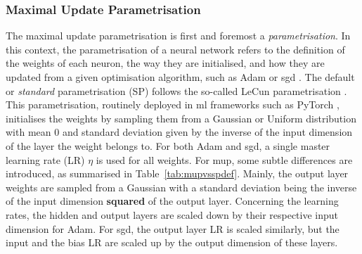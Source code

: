 \subsubsection{Maximal Update Parametrisation}
The maximal update parametrisation is first and foremost a \textit{parametrisation}. In this context, the parametrisation of a neural network refers to the definition of the weights of each neuron, the way they are initialised, and how they are updated from a given optimisation algorithm, such as Adam or \gls{sgd} \cite{adamPaper}. The default or \textit{standard} parametrisation (SP) follows the so-called LeCun parametrisation \cite{LeCun2012}. This parametrisation, routinely deployed in \gls{ml} frameworks such as PyTorch \cite{pytorch}, initialises the weights by sampling them from a Gaussian or Uniform distribution with mean 0 and standard deviation given by the inverse of the input dimension of the layer the weight belongs to. For both Adam and \gls{sgd}, a single master learning rate (LR) $\eta$ is used for all weights. For \gls{mup}, some subtle differences are introduced, as summarised in Table~\ref{tab:mupvsspdef}. Mainly, the output layer weights are sampled from a Gaussian with a standard deviation being the inverse of the input dimension \textbf{squared} of the output layer. Concerning the learning rates, the hidden and output layers are scaled down by their respective input dimension for Adam. For \gls{sgd}, the output layer LR is scaled similarly, but the input and the bias LR are scaled up by the output dimension of these layers. 

